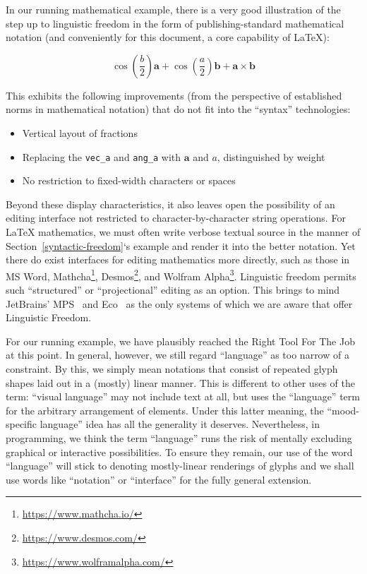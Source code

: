 \documentclass[ twoside,openright,titlepage,numbers=noenddot,headinclude,footinclude,cleardoublepage=empty,abstract=on,
                BCOR=5mm,paper=a4,fontsize=11pt
                ]{scrreprt}
\providecommand{\tightlist}{}\newenvironment{longtable}[2]{\begin{tabular}}{\end{tabular}}
\theoremstyle{definition}
\begin{document}
In our running mathematical example, there is a very good illustration
of the step up to linguistic freedom in the form of publishing-standard
mathematical notation (and conveniently for this document, a core
capability of \LaTeX):

\[\cos\left(\frac{b}{2}\right)\mathbf{a} + \cos\left(\frac{a}{2}\right)\mathbf{b} + \mathbf{a} \times \mathbf{b}\]

This exhibits the following improvements (from the perspective of
established norms in mathematical notation) that do not fit into the
``syntax'' technologies:

\begin{itemize}
\tightlist
\item
  Vertical layout of fractions
\item
  Replacing the \texttt{vec\_a} and \texttt{ang\_a} with \(\mathbf{a}\)
  and \(a\), distinguished by weight
\item
  No restriction to fixed-width characters or spaces
\end{itemize}

Beyond these display characteristics, it also leaves open the
possibility of an editing interface not restricted to
character-by-character string operations. For \LaTeX{} mathematics, we
must often write verbose textual source in the manner of
Section~\ref{syntactic-freedom}`s example and render it into the better
notation. Yet there do exist interfaces for editing mathematics more
directly, such as those in MS Word, Mathcha\footnote{\url{https://www.mathcha.io/}},
Desmos\footnote{\url{https://www.desmos.com/}}, and Wolfram
Alpha\footnote{\url{https://www.wolframalpha.com/}}. Linguistic freedom
permits such ``structured'' or ``projectional'' editing as an option.
This brings to mind JetBrains' MPS~\parencite{MPS} and
Eco~\parencite{Eco} as the only systems of which we are aware that offer
Linguistic Freedom.

For our running example, we have plausibly reached the Right Tool For
The Job at this point. In general, however, we still regard ``language''
as too narrow of a constraint. By this, we simply mean notations that
consist of repeated glyph shapes laid out in a (mostly) linear manner.
This is different to other uses of the term: ``visual language'' may not
include text at all, but uses the ``language'' term for the arbitrary
arrangement of elements. Under this latter meaning, the ``mood-specific
language'' idea has all the generality it deserves. Nevertheless, in
programming, we think the term ``language'' runs the risk of mentally
excluding graphical or interactive possibilities. To ensure they remain,
our use of the word ``language'' will stick to denoting mostly-linear
renderings of glyphs and we shall use words like ``notation'' or
``interface'' for the fully general extension.
\end{document}

